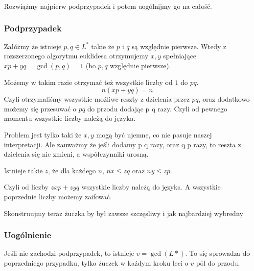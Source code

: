 \documentclass{article}
\begin{document}
Rozwiążmy najpierw podprzypadek i potem uogólnijmy go na całość.

\subsubsection*{Podprzypadek}
Załóżmy że istnieje $p, q \in L^*$ takie że $p$ i $q$ są względnie pierwsze. Wtedy z rozszerzonego algorytmu euklidesa
otrzymujemy $x, y$ spełniające $x p + y q = \gcd(p, q) = 1$ (bo $p, q$ względnie pierwsze). 

Możemy w takim razie otrzymać też wszystkie liczby od $1$ do $ p q$.
\[
    n (x p + y q) = n
\]
Czyli otrzymaliśmy wszystkie możliwe reszty z dzielenia przez $p q$, oraz dodatkowo możemy się przesuwać o $p q$ do przodu dodając p q razy.
Czyli od pewnego momentu wszystkie liczby należą do języka.

Problem jest tylko taki że $x,y$ mogą być ujemne, co nie pasuje naszej interpretacji. Ale zauważmy że jeśli dodamy p q razy, oraz q
p razy, to reszta z dzielenia się nie zmieni, a współczynniki urosną.

Istnieje takie $z$, że dla każdego $n$, $n x \leq z q$ oraz $n y \leq z p$.

Czyli od liczby $ z x p + z y q$ wszystkie liczby należą do języka. A wszystkie poprzednie liczby możemy zaifować.


Skonstruujmy teraz żuczka by był zawsze szczęsliwy i jak najbardziej wybredny \newline



\subsubsection*{Uogólnienie}
Jeśli nie zachodzi podprzypadek, to istnieje $v = \gcd(L*)$. To się sprowadza do poprzedniego przypadku, 
tylko żuczek w każdym kroku leci o $v$ pól do przodu.
\end{document}
